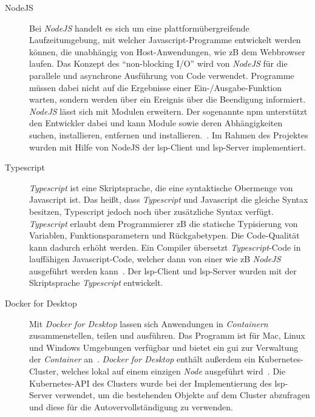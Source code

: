 \begin{description}
      \item[NodeJS]
            Bei \textit{NodeJS} handelt es sich um eine plattformübergreifende Laufzeitumgebung, mit welcher Javascript-Programme entwickelt werden können,
            die unabhängig von Host-Anwendungen, wie \ac{zB} dem Webbrowser laufen.
            Das Konzept des ``non-blocking I/O'' wird von \textit{NodeJS} für die parallele und asynchrone Ausführung von Code verwendet.
            Programme müssen dabei nicht auf die Ergebnisse einer Ein-/Ausgabe-Funktion warten,
            sondern werden über ein Ereignis über die Beendigung informiert.
            \textit{NodeJS} lässt sich mit Modulen erweitern.
            Der sogenannte \ac{npm} unterstützt den Entwickler dabei und kann Module sowie deren Abhängigkeiten suchen,
            installieren, entfernen und installieren.~\cite{node-js-dev-insider,node-js-about}.
            Im Rahmen des Projektes wurden mit Hilfe von NodeJS der \ac{lsp}-Client und \ac{lsp}-Server implementiert.
      \item[Typescript]
            \textit{Typescript} ist eine Skriptsprache, die eine syntaktische Obermenge von Javascript ist. Das heißt, dass \textit{Typescript} und Javascript
            die gleiche Syntax besitzen, Typescript jedoch noch über zusätzliche Syntax verfügt.
            \textit{Typescript} erlaubt dem Programmierer \ac{zB} die statische Typisierung von Variablen, Funktionsparametern und Rückgabetypen.
            Die Code-Qualität kann dadurch erhöht werden. Ein Compiler übersetzt \textit{Typescript}-Code in lauffähigen Javascript-Code, welcher dann von einer
            wie \ac{zB} \textit{NodeJS} ausgeführt werden kann~\cite{typescript-kinsta,typescript-doubleslash-blog}.
            Der \ac{lsp}-Client und \ac{lsp}-Server wurden mit der Skriptsprache \textit{Typescript} entwickelt.
      \item[Docker for Desktop]
            Mit \textit{Docker for Desktop} lassen sich Anwendungen in \textit{Containern} zusammenstellen, teilen und ausführen.
            Das Programm ist für Mac, Linux und Windows Umgebungen verfügbar und bietet ein \ac{gui} zur Verwaltung der \textit{Container} an~\cite{docker-for-desktop-overview}.
            \textit{Docker for Desktop} enthält außerdem ein Kubernetes-Cluster, welches lokal auf einem einzigen \textit{Node} ausgeführt wird~\cite{docker-for-desktop-kubernetes}.
            Die Kubernetes-API des Clusters wurde bei der Implementierung des \ac{lsp}-Server verwendet, um
            die bestehenden Objekte auf dem Cluster abzufragen und diese für die Autovervollständigung zu verwenden.

\end{description}
